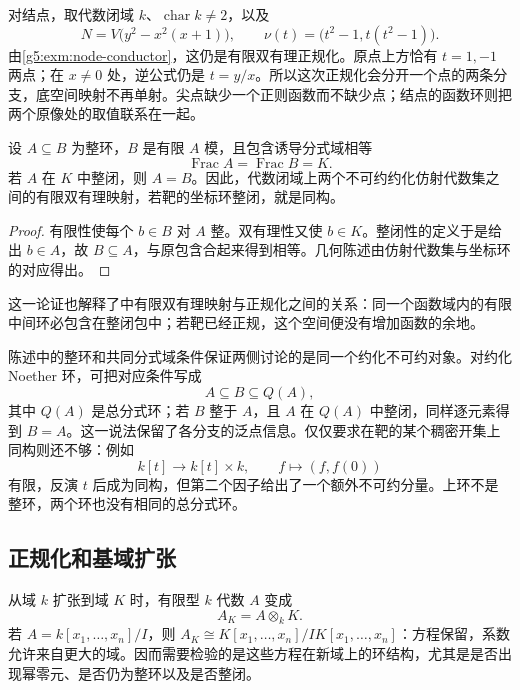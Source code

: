 \ProseParagraphBreak

对结点，取代数闭域 \(k\)、\(\operatorname{char}k\ne2\)，以及
\[
	N=V\bigl(y^2-x^2(x+1)\bigr),\qquad
	\nu(t)=\bigl(t^2-1,t(t^2-1)\bigr).
\]
由\cref{g5:exm:node-conductor}，这仍是有限双有理正规化。原点上方恰有 \(t=1,-1\) 两点；在 \(x\ne0\) 处，逆公式仍是 \(t=y/x\)。所以这次正规化会分开一个点的两条分支，底空间映射不再单射。尖点缺少一个正则函数而不缺少点；结点的函数环则把两个原像处的取值联系在一起。

\begin{proposition}
\label{g5:prop:finite-birational-normal-target}
	设 \(A\subseteq B\) 为整环，\(B\) 是有限 \(A\) 模，且包含诱导分式域相等
	\[
		\operatorname{Frac}A=\operatorname{Frac}B=K.
	\]
	若 \(A\) 在 \(K\) 中整闭，则 \(A=B\)。因此，代数闭域上两个不可约约化仿射代数集之间的有限双有理映射，若靶的坐标环整闭，就是同构。
\end{proposition}
\begin{proof}
	有限性使每个 \(b\in B\) 对 \(A\) 整。双有理性又使 \(b\in K\)。整闭性的定义于是给出 \(b\in A\)，故 \(B\subseteq A\)，与原包含合起来得到相等。几何陈述由仿射代数集与坐标环的对应得出。
\end{proof}

这一论证也解释了\cite[第2章，第5.2节，定理2.21，第129页]{Shafarevich2013Basic1}中有限双有理映射与正规化之间的关系：同一个函数域内的有限中间环必包含在整闭包中；若靶已经正规，这个空间便没有增加函数的余地。

\ProseParagraphBreak

陈述中的整环和共同分式域条件保证两侧讨论的是同一个约化不可约对象。对约化 Noether 环，可把对应条件写成
\[
	A\subseteq B\subseteq Q(A),
\]
其中 \(Q(A)\) 是总分式环；若 \(B\) 整于 \(A\)，且 \(A\) 在 \(Q(A)\) 中整闭，同样逐元素得到 \(B=A\)。这一说法保留了各分支的泛点信息。仅仅要求在靶的某个稠密开集上同构则还不够：例如
\[
	k[t]\longrightarrow k[t]\times k,\qquad
	f\longmapsto(f,f(0))
\]
有限，反演 \(t\) 后成为同构，但第二个因子给出了一个额外不可约分量。上环不是整环，两个环也没有相同的总分式环。

\subsection{正规化和基域扩张}
\label{g5:subsec:0404:02}

从域 \(k\) 扩张到域 \(K\) 时，有限型 \(k\) 代数 \(A\) 变成
\[
	A_K=A\otimes_k K.
\]
若 \(A=k[x_1,\ldots,x_n]/I\)，则 \(A_K\cong K[x_1,\ldots,x_n]/IK[x_1,\ldots,x_n]\)：方程保留，系数允许来自更大的域。因而需要检验的是这些方程在新域上的环结构，尤其是是否出现幂零元、是否仍为整环以及是否整闭。

